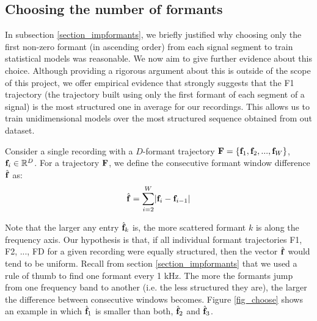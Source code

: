 \documentclass[../main.tex]{subfiles}
\begin{document}
\subsection{Choosing the number of formants} \label{section_choosing}
In subsection \ref{section_impformants}, we briefly justified why choosing only the first non-zero formant (in ascending order) from each signal segment to train statistical models was reasonable. We now aim to give further evidence about this choice. Although providing a rigorous argument about this is outside of the scope of this project, we offer empirical evidence that strongly suggests that the F1 trajectory (the trajectory built using only the first formant of each segment of a signal) is the most structured one in average for our recordings. This allows us to train unidimensional models over the most structured sequence obtained from out dataset.
\par Consider a single recording with a $D$-formant trajectory $\mathbf{F} = \{\mathbf{f}_1, \mathbf{f}_2, ..., \mathbf{f}_W\}$, $\mathbf{f}_i \in \mathbb{R}^D$. For a trajectory $\mathbf{F}$, we define the consecutive formant window difference $\hat{\mathbf{f}}$ as:
\begin{align*} 
\hat{\mathbf{f}} = \sum_{i=2}^W \lvert\mathbf{f}_{i} - \mathbf{f}_{i-1}\rvert
\end{align*}
\par Note that the larger any entry $\hat{\mathbf{f}}_k$ is, the more scattered formant $k$ is along the frequency axis. Our hypothesis is that, if all individual formant trajectories F1, F2, ..., FD for a given recording were equally structured, then the vector $\hat{\mathbf{f}}$ would tend to be uniform. Recall from section \ref{section_impformants} that we used a rule of thumb to find one formant every 1 kHz. The more the formants jump from one frequency band to another (i.e. the less structured they are), the larger the difference between consecutive windows becomes. Figure \ref{fig_choose} shows an example in which $\hat{\mathbf{f}}_1$ is smaller than both, $\hat{\mathbf{f}}_2$ and $\hat{\mathbf{f}}_3$.
\end{document}
